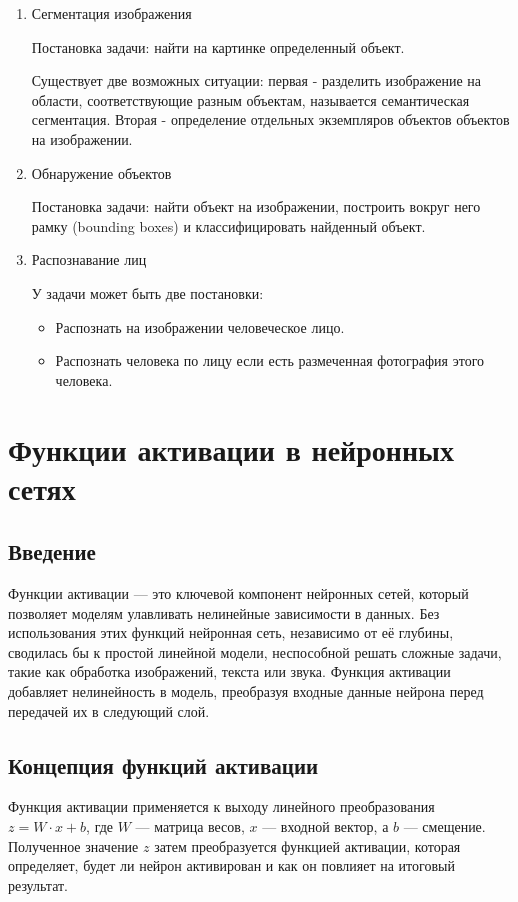 {\begin{enumerate}
    \item Сегментация изображения

          Постановка задачи: найти на картинке определенный объект.

          Существует две возможных ситуации: первая - разделить изображение на области, соответствующие
          разным объектам, называется семантическая сегментация. Вторая - определение отдельных экземпляров
          объектов объектов на изображении.

    \item Обнаружение объектов

          Постановка задачи: найти объект на изображении, построить вокруг него рамку (bounding boxes) и
          классифицировать найденный объект.

    \item Распознавание лиц

          У задачи может быть две постановки:
          \begin{itemize}
              \item Распознать на изображении человеческое лицо.
              \item Распознать человека по лицу если есть размеченная фотография этого человека.
          \end{itemize}
\end{enumerate}


\section*{Функции активации в нейронных сетях}

\subsection*{Введение}
Функции активации — это ключевой компонент нейронных сетей, который позволяет моделям улавливать нелинейные зависимости в данных. Без использования этих функций нейронная сеть, независимо от её глубины, сводилась бы к простой линейной модели, неспособной решать сложные задачи, такие как обработка изображений, текста или звука. Функция активации добавляет нелинейность в модель, преобразуя входные данные нейрона перед передачей их в следующий слой.

\subsection*{Концепция функций активации}
Функция активации применяется к выходу линейного преобразования $z = W \cdot x + b$, где $W$ — матрица весов, $x$ — входной вектор, а $b$ — смещение. Полученное значение $z$ затем преобразуется функцией активации, которая определяет, будет ли нейрон активирован и как он повлияет на итоговый результат.

}
